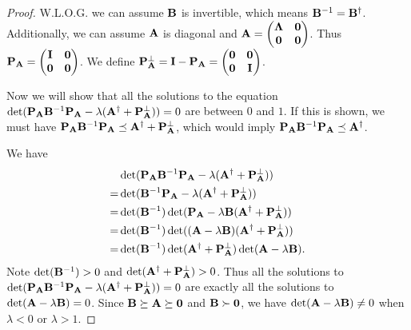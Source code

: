 \begin{proof}
W.L.O.G. we can assume $\mathbf{B}$ is invertible, which means $\mathbf{B}^{-1}=\mathbf{B}^{\dag}$. Additionally, we can assume $\mathbf{A}$ is diagonal and $\mathbf{A}= \begin{pmatrix}\mathbf{\Lambda} &\mathbf{0} \\\mathbf{0}& \mathbf{0}\end{pmatrix} $. Thus $\mathbf{P}_
{\mathbf{A}} =  \begin{pmatrix} \mathbf{I} & \mathbf{0} \\\mathbf{0}& \mathbf{0}\end{pmatrix}$. We define $\mathbf{P}_{\mathbf{A}}^\perp = \mathbf{I}-\mathbf{P}_{\mathbf{A}} =\begin{pmatrix} \mathbf{0} & \mathbf{0} \\ \mathbf{0}& \mathbf{I}\end{pmatrix}$. 

Now we will show that all the solutions to the equation $\det(\mathbf{P}_{\mathbf{A}}\mathbf{B}^{-1}\mathbf{P}_{\mathbf{A}}-\lambda (\mathbf{A}^\dag + \mathbf{P}_{\mathbf{A}}^\perp))=0$ are between $0$ and $1$.
If this is shown, we must have $\mathbf{P}_{\mathbf{A}}\mathbf{B}^{-1}\mathbf{P}_{\mathbf{A}} \preceq \mathbf{A}^\dag + \mathbf{P}_{\mathbf{A}}^\perp$, which would imply $\mathbf{P}_{\mathbf{A}}\mathbf{B}^{-1}\mathbf{P}_{\mathbf{A}} \preceq \mathbf{A}^\dag$. 

We have
\begin{equation}
\begin{split}
&\det(\mathbf{P}_{\mathbf{A}}\mathbf{B}^{-1}\mathbf{P}_{\mathbf{A}}-\lambda (\mathbf{A}^\dag + \mathbf{P}_{\mathbf{A}}^\perp)) \\
=& \det(\mathbf{B}^{-1}\mathbf{P}_{\mathbf{A}}-\lambda (\mathbf{A}^\dag + \mathbf{P}_{\mathbf{A}}^\perp)) \\
=& \det(\mathbf{B}^{-1})\det(\mathbf{P}_{\mathbf{A}}-\lambda \mathbf{B}(\mathbf{A}^\dag + \mathbf{P}_{\mathbf{A}}^\perp))\\
= &\det(\mathbf{B}^{-1})\det((\mathbf{A}-\lambda \mathbf{B})(\mathbf{A}^\dag + \mathbf{P}_{\mathbf{A}}^\perp))\\ 
= &\det(\mathbf{B}^{-1})\det(\mathbf{A}^\dag + \mathbf{P}_{\mathbf{A}}^\perp)\det(\mathbf{A}-\lambda \mathbf{B}).
\end{split}
\end{equation}
Note $\det(\mathbf{B}^{-1})>0$ and $\det(\mathbf{A}^\dag + \mathbf{P}_{\mathbf{A}}^\perp)>0$.
Thus all the solutions to  $\det(\mathbf{P}_{\mathbf{A}}\mathbf{B}^{-1}\mathbf{P}_{\mathbf{A}}-\lambda (\mathbf{A}^\dag + \mathbf{P}_{\mathbf{A}}^\perp))=0$ are exactly all the solutions to $\det(\mathbf{A}-\lambda \mathbf{B})=0$. Since $\mathbf{B}\succeq \mathbf{A}\succeq \mathbf{0}$ and $\mathbf{B} \succ \mathbf{0}$, we have $\det(\mathbf{A}-\lambda \mathbf{B})\neq 0$ when $\lambda<0$ or $\lambda >1$.
\end{proof}



